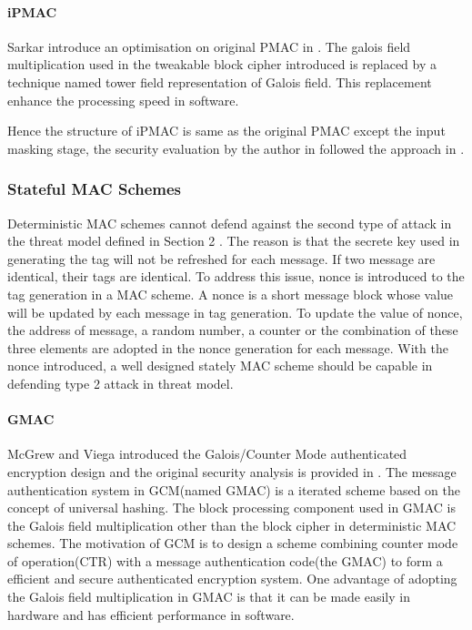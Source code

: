 \documentclass{article}
\begin{document}
\paragraph{iPMAC}
Sarkar introduce an optimisation on original PMAC in \cite{iPMAC}. The galois field multiplication used in the tweakable block cipher introduced is replaced by a technique named tower field representation of Galois field. This replacement enhance the processing speed in software.

Hence the structure of iPMAC is same as the original PMAC except the input masking stage, the security evaluation by the author in \cite{iPMAC} followed the approach in \cite{pmac}.

\subsubsection{Stateful MAC Schemes}
Deterministic MAC schemes cannot defend against the second type of attack in the
threat model defined in Section 2 . The reason is that the secrete key used in generating the tag will not be refreshed for each message. If two message are identical, their tags are identical. To address this issue, nonce is introduced to the tag generation in a MAC scheme. A nonce is a short message block whose value will be updated by each message in tag generation. To update the value of nonce, the address of message, a random number, a counter or the combination of these three elements are adopted in the nonce generation for each message. With the nonce introduced, a well designed stately MAC scheme should be capable in defending type 2 attack in threat model.
\paragraph{GMAC}
McGrew and Viega introduced the Galois/Counter Mode authenticated encryption design and the original security analysis is provided in \cite{gcm}. The message authentication system in GCM(named GMAC) is a iterated scheme based on the concept of universal hashing. The block processing component used in GMAC is the Galois field multiplication other than the block cipher in deterministic MAC schemes. 
The motivation of GCM is to design a scheme combining counter mode of operation(CTR) with a message authentication code(the GMAC) to form a efficient and secure authenticated encryption system.
One advantage of adopting the Galois field multiplication in GMAC is that it can be made easily in hardware and has efficient performance in software. 
\end{document}
